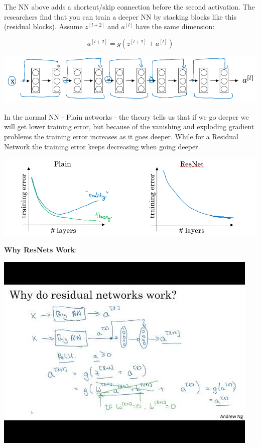 \documentclass{article}
\begin{document}
\noindent The NN above adds a shortcut/skip connection before the second activation. The researchers find that you can train a deeper NN by stacking blocks like this (residual blocks). Assume \(z^{[l + 2]}\) and \(a^{[l]}\) have the same dimension:

\[a^{[l + 2]} = g(z^{[l + 2]} + a^{[l]})\]

\begin{center}
\includegraphics[scale=0.4]{./images/resnet_blocks.png}
\end{center}

\noindent In the normal NN - Plain networks - the theory tells us that if we go deeper we will get lower training error, but because of the vanishing and exploding gradient problems the training error increases as it goes deeper. While for a Residual Network the training error keeps decreasing when going deeper.

\begin{center}
\includegraphics[scale=0.4]{./images/resnet_training_error.png}
\end{center}

\noindent \textbf{Why ResNets Work}:

\begin{center}
\includegraphics[scale=0.6]{./images/resnet_why.jpg}
\end{center}
\end{document}

